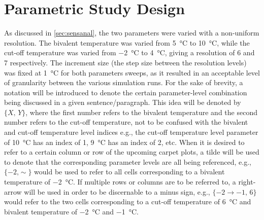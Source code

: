 \section{Parametric Study Design}
As discussed in \cref{sec:sensanal}, the two parameters were varied with a non-uniform resolution. The bivalent temperature was varied from \qty{5}{\celsius} to \qty{10}{\celsius}, while the cut-off temperature was varied from \qty{-2}{\celsius} to \qty{4}{\celsius}, giving a resolution of 6 and 7 respectively. The increment size (the step size between the resolution levels) was fixed at \qty{1}{\celsius} for both parameters sweeps, as it resulted in an acceptable level of granularity between the various simulation runs. For the sake of brevity, a notation will be introduced to denote the certain parameter-level combination being discussed in a given sentence/paragraph. This idea will be denoted by $\{X\text{, }Y\}$, where the first number refers to the bivalent temperature and the second number refers to the cut-off temperature, not to be confused with the bivalent and cut-off temperature level indices e.g., the cut-off temperature level parameter of \qty{10}{\celsius} has an index of 1, \qty{9}{\celsius} has an index of 2, etc. When it is desired to refer to a certain column or row of the upcoming carpet plots, a tilde will be used to denote that the corresponding parameter levels are all being referenced, e.g., $\{-2\text{,}\sim\}$ would be used to refer to all cells corresponding to a bivalent temperature of \qty{-2}{\celsius}. If multiple rows or columns are to be referred to, a right-arrow will be used in order to be discernable to a minus sign, e.g., $\{-2\rightarrow-1\text{, }6\}$ would refer to the two cells corresponding to a cut-off temperature of \qty{6}{\celsius} and bivalent temperature of \qty{-2}{\celsius} and \qty{-1}{\celsius}.


